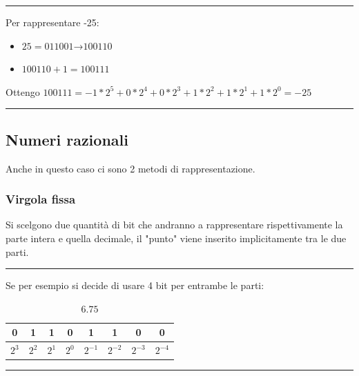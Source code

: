 \documentclass{article}
\begin{document}
\vspace{3pt}

\noindent\rule{\textwidth}{0.5pt}

    \noindent Per rappresentare -25:

    \begin{itemize}
        \item $ 25 = 011001 $→$ 100110$
        \item $ 100110 + 1 = 100111$
    \end{itemize}

\noindent Ottengo $100111 = -1*2^5 + 0*2^4 + 0*2^3
+ 1*2^2 +1*2^1 + 1*2^0 = -25$

\noindent\rule{\textwidth}{0.5pt}

\subsection{Numeri razionali}

Anche in questo caso ci sono 2 metodi di rappresentazione.

\subsubsection{Virgola fissa}

Si scelgono due quantità di bit che andranno a rappresentare rispettivamente la parte intera e quella decimale, il "punto" viene inserito implicitamente tra le due parti.\newline

\noindent\rule{\textwidth}{0.5pt}

\noindent Se per esempio si decide di usare 4 bit per entrambe le parti:

\begin{table}[ht]
    \centering
    \begin{tabular}{cccc|cccc}
        0 & 1 & 1 & 0 & 1 & 1 & 0 & 0\\
        \hline
        \rule{0pt}{3ex}$2^3$ & $2^2$ & $2^1$ & $2^0$ & $2^{-1}$ & $2^{-2}$ & $2^{-3}$ & $2^{-4}$\\
    \end{tabular}
    \caption{$6.75$}
    \label{tab:fixpoint_num}
\end{table}

\vspace{-15pt}

\noindent\rule{\textwidth}{0.5pt}

\vspace{-7pt}
\end{document}
